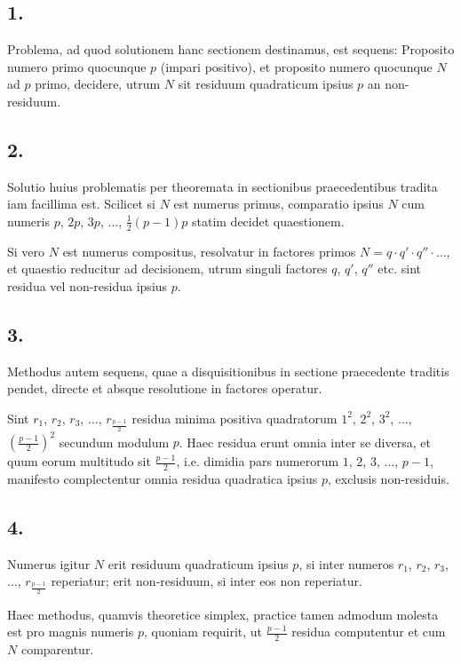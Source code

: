 \documentclass[12pt,a4paper]{article}
\theoremstyle{plain}
\theoremstyle{definition}
\theoremstyle{remark}
\begin{document}
\subsection*{1.}
Problema, ad quod solutionem hanc sectionem destinamus, est sequens: Proposito numero primo quocunque $p$ (impari positivo), et proposito numero quocunque $N$ ad $p$ primo, decidere, utrum $N$ sit residuum quadraticum ipsius $p$ an non-residuum.

\subsection*{2.}
Solutio huius problematis per theoremata in sectionibus praecedentibus tradita iam facillima est. Scilicet si $N$ est numerus primus, comparatio ipsius $N$ cum numeris $p$, $2p$, $3p$, $\ldots$, $\frac{1}{2}(p-1)p$ statim decidet quaestionem.

Si vero $N$ est numerus compositus, resolvatur in factores primos $N=q \cdot q' \cdot q'' \cdot \ldots$, et quaestio reducitur ad decisionem, utrum singuli factores $q$, $q'$, $q''$ etc. sint residua vel non-residua ipsius $p$.

\subsection*{3.}
Methodus autem sequens, quae a disquisitionibus in sectione praecedente traditis pendet, directe et absque resolutione in factores operatur.

Sint $r_1$, $r_2$, $r_3$, $\ldots$, $r_{\frac{p-1}{2}}$ residua minima positiva quadratorum $1^2$, $2^2$, $3^2$, $\ldots$, $\left(\frac{p-1}{2}\right)^2$ secundum modulum $p$. Haec residua erunt omnia inter se diversa, et quum eorum multitudo sit $\frac{p-1}{2}$, i.e. dimidia pars numerorum $1$, $2$, $3$, $\ldots$, $p-1$, manifesto complectentur omnia residua quadratica ipsius $p$, exclusis non-residuis.

\subsection*{4.}
Numerus igitur $N$ erit residuum quadraticum ipsius $p$, si inter numeros $r_1$, $r_2$, $r_3$, $\ldots$, $r_{\frac{p-1}{2}}$ reperiatur; erit non-residuum, si inter eos non reperiatur.

Haec methodus, quamvis theoretice simplex, practice tamen admodum molesta est pro magnis numeris $p$, quoniam requirit, ut $\frac{p-1}{2}$ residua computentur et cum $N$ comparentur.
\end{document}
